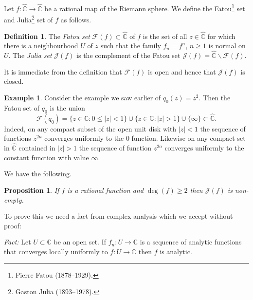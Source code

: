 \documentclass[12pt]{article}
\newtheorem{proposition}[theorem]{Proposition}
\theoremstyle{definition}
\newtheorem{definition}[theorem]{Definition}
\newtheorem{example}[theorem]{Example}
\theoremstyle{remark}
\begin{document}
Let $f : \widehat{\mathbb{C}} \to \widehat{\mathbb{C}}$ be a rational map of the Riemann sphere.
We define the Fatou\footnote{Pierre Fatou (1878--1929).} set and Julia\footnote{Gaston Julia (1893--1978).} set of $f$ as follows.

\begin{definition}
The \emph{Fatou set} $\mathcal{F}(f) \subset \widehat{\mathbb{C}}$ of $f$ is the set of all $z \in \widehat{\mathbb{C}}$ for which there is 
a neighbourhood $U$ of $z$ such that the family $f_n = f^n$, $n\ge 1$ is normal on $U$. The \emph{Julia set} $\mathcal{J}(f)$ is the complement of the Fatou set $\mathcal{J}(f) = \widehat{\mathbb{C}} \backslash \mathcal{F}(f)$.
\end{definition}

It is immediate from the definition that $\mathcal F(f)$ is open and hence that $\mathcal J(f)$ is closed.

\begin{example}
Consider the example we saw earlier of $q_0(z) = z^2$. Then the Fatou set of $q_0$ is the union
\[
\mathcal{F}(q_0) = \{ z \in \mathbb{C} : 0 \le  |z| < 1\} \cup \{ z \in \mathbb{C} : |z| > 1 \} \cup \{\infty\} \subset \widehat{\mathbb{C}}.
\]
Indeed, on any compact subset of the open unit disk with $|z| < 1$ the sequence of functions $z^{2n}$ converges uniformly to the $0$ function. Likewise on any compact set in $\widehat{\mathbb{C}}$ contained in $|z| > 1$ the sequence of function $z^{2n}$ converges uniformly to the constant function with value $\infty$.
\end{example}


We have the following. 

\begin{proposition}
If $f$ is a rational function and $\deg(f) \ge 2$ then $\mathcal J(f)$ is non-empty.
\end{proposition}


To prove this we need a fact from complex analysis which we accept without proof:\\
\smallskip

\noindent\textit{Fact:} Let $U\subset \mathbb{C}$ be an open set. If $f_n : U \to \mathbb{C}$ is a sequence of analytic functions that converges locally uniformly to $f : U \to \mathbb{C}$ then $f$ is analytic.\\
\end{document}
